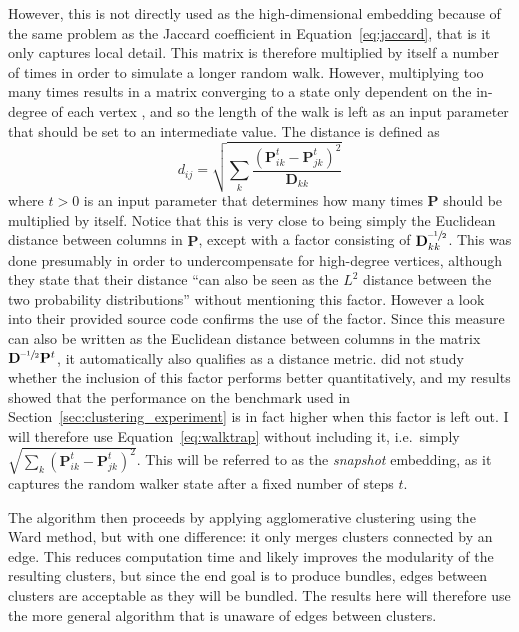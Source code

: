 However, this is not directly used as the high-dimensional embedding because of the same problem as the Jaccard coefficient in Equation~\eqref{eq:jaccard}, that is it only captures local detail. This matrix is therefore multiplied by itself a number of times in order to simulate a longer random walk. However, multiplying too many times results in a matrix converging to a state only dependent on the in-degree of each vertex \cite{Pons2006}, and so the length of the walk is left as an input parameter that should be set to an intermediate value.
The distance is defined as
\begin{equation}
  d_{ij} = \sqrt{\sum_{k}\frac{(\mathbf{P}_{ik}^t - \mathbf{P}_{jk}^t)^2}{\mathbf{D}_{kk}}}
  \label{eq:walktrap}
\end{equation}
where $t>0$ is an input parameter that determines how many times $\mathbf{P}$ should be multiplied by itself.
Notice that this is very close to being simply the Euclidean distance between columns in $\mathbf{P}$, except with a factor consisting of $\mathbf{D}_{kk}^{\text{--}\sfrac{1}{2}}$. This was done presumably in order to undercompensate for high-degree vertices, although they state that their distance ``can also be seen as the $L^2$ distance between the two probability distributions'' \cite{Pons2006} without mentioning this factor. However a look into their provided source code confirms the use of the factor.
Since this measure can also be written as the Euclidean distance between columns in the matrix $\mathbf{D}^{\text{--}\sfrac{1}{2}}\mathbf{P}^t$, it automatically also qualifies as a distance metric.
\cite{Pons2006} did not study whether the inclusion of this factor performs better quantitatively, and my results showed that the performance on the benchmark used in Section~\ref{sec:clustering_experiment} is in fact higher when this factor is left out. I will therefore use Equation~\eqref{eq:walktrap} without including it, i.e.\ simply $\sqrt{\sum_{k}(\mathbf{P}_{ik}^t - \mathbf{P}_{jk}^t)^2}$. This will be referred to as the \emph{snapshot} embedding, as it captures the random walker state after a fixed number of steps $t$.

The algorithm then proceeds by applying agglomerative clustering using the Ward method, but with one difference: it only merges clusters connected by an edge. This reduces computation time and likely improves the modularity of the resulting clusters, but since the end goal is to produce bundles, edges between clusters are acceptable as they will be bundled. The results here will therefore use the more general algorithm that is unaware of edges between clusters.


